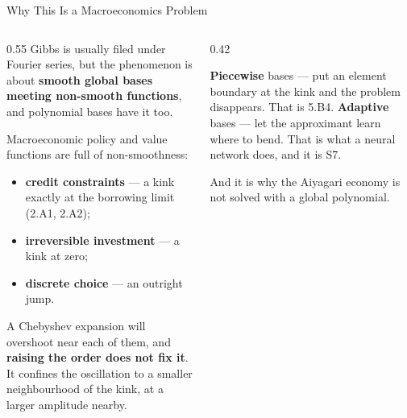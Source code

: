 \begin{frame}{Why This Is a Macroeconomics Problem}
\begin{columns}[T]
\begin{column}{0.55\textwidth}
\small
Gibbs is usually filed under Fourier series, but the phenomenon is about \textbf{smooth global bases meeting non-smooth functions}, and polynomial bases have it too.
\medskip

Macroeconomic policy and value functions are full of non-smoothness:
\begin{itemize}\small
  \item \textbf{credit constraints} --- a kink exactly at the borrowing limit (2.A1, 2.A2);
  \item \textbf{irreversible investment} --- a kink at zero;
  \item \textbf{discrete choice} --- an outright jump.
\end{itemize}
\medskip
A Chebyshev expansion will overshoot near each of them, and \textbf{raising the order does not fix it}. It confines the oscillation to a smaller neighbourhood of the kink, at a larger amplitude nearby.
\end{column}
\begin{column}{0.42\textwidth}
\begin{conceptbox}[title=\textbf{Two ways out}]\small
\textbf{Piecewise} bases --- put an element boundary at the kink and the problem disappears. That is 5.B4.
\medskip
\textbf{Adaptive} bases --- let the approximant learn where to bend. That is what a neural network does, and it is S7.
\end{conceptbox}
\medskip
\begin{cautionbox}\footnotesize
And it is why the Aiyagari economy is not solved with a global polynomial.
\end{cautionbox}
\end{column}
\end{columns}
\vspace{1mm}
\end{frame}

